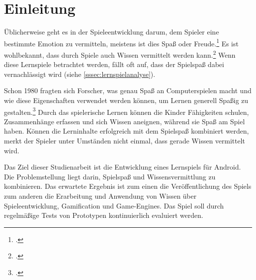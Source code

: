 \section{Einleitung}
	Üblicherweise geht es in der Spieleentwicklung darum, dem Spieler eine bestimmte Emotion zu vermitteln, meistens ist dies Spaß oder Freude.\footcite[Abstract]{persona} Es ist wohlbekannt, dass durch Spiele auch Wissen vermittelt werden kann.\footcite{generalgameandlearning} Wenn diese Lernspiele betrachtet werden, fällt oft auf, dass der Spielspaß dabei vernachlässigt wird (siehe \ref{sssec:lernspielanalyse}).

	Schon 1980 fragten sich Forscher, was genau Spaß an Computerspielen macht und wie diese Eigenschaften verwendet werden können, um Lernen generell Spaßig zu gestalten.\footcite{learn-game-history} Durch das spielerische Lernen können die Kinder Fähigkeiten schulen, Zusammenhänge erfassen und sich Wissen aneignen, während sie Spaß am Spiel haben. Können die Lerninhalte erfolgreich mit dem Spielspaß kombiniert werden, merkt der Spieler unter Umständen nicht einmal, dass gerade Wissen vermittelt wird.

	Das Ziel dieser Studienarbeit ist die Entwicklung eines Lernspiels für Android. Die Problemstellung liegt darin, Spielspaß und Wissensvermittlung zu kombinieren. Das erwartete Ergebnis ist zum einen die Veröffentlichung des Spiels zum anderen die Erarbeitung und Anwendung von Wissen über Spieleentwicklung, Gamification und Game-Engines. Das Spiel soll durch regelmäßige Tests von Prototypen kontinuierlich evaluiert werden.

